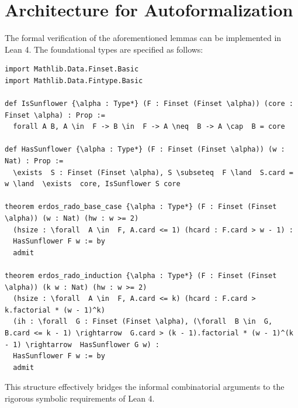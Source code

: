 \documentclass[12pt,a4paper]{article}
\begin{document}
\section{Architecture for Autoformalization}
The formal verification of the aforementioned lemmas can be implemented in Lean 4. The foundational types are specified as follows:

\begin{lstlisting}[basicstyle=\ttfamily\small, breaklines=true]
import Mathlib.Data.Finset.Basic
import Mathlib.Data.Fintype.Basic

def IsSunflower {\alpha : Type*} (F : Finset (Finset \alpha)) (core : Finset \alpha) : Prop :=
  forall A B, A \in  F -> B \in  F -> A \neq  B -> A \cap  B = core

def HasSunflower {\alpha : Type*} (F : Finset (Finset \alpha)) (w : Nat) : Prop :=
  \exists  S : Finset (Finset \alpha), S \subseteq  F \land  S.card = w \land  \exists  core, IsSunflower S core

theorem erdos_rado_base_case {\alpha : Type*} (F : Finset (Finset \alpha)) (w : Nat) (hw : w >= 2)
  (hsize : \forall  A \in  F, A.card <= 1) (hcard : F.card > w - 1) :
  HasSunflower F w := by
  admit

theorem erdos_rado_induction {\alpha : Type*} (F : Finset (Finset \alpha)) (k w : Nat) (hw : w >= 2)
  (hsize : \forall  A \in  F, A.card <= k) (hcard : F.card > k.factorial * (w - 1)^k)
  (ih : \forall  G : Finset (Finset \alpha), (\forall  B \in  G, B.card <= k - 1) \rightarrow  G.card > (k - 1).factorial * (w - 1)^(k - 1) \rightarrow  HasSunflower G w) :
  HasSunflower F w := by
  admit
\end{lstlisting}

This structure effectively bridges the informal combinatorial arguments to the rigorous symbolic requirements of Lean 4.
\end{document}
